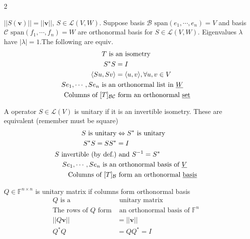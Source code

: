 \documentclass[a4paper,8pt]{extarticle} %
\newcommand{\mybox}[2]{
    \begin{tcolorbox}[colback=lightblue!5!white,colframe=lightblue!75!black,boxsep=1pt,arc=0pt,outer arc=0pt,coltext=black,title={\textcolor{black}{#1}}, before skip=2pt, after skip=2pt]
        #2
    \end{tcolorbox}
}
\begin{document}
\begin{multicols*}{2}
\mybox{Isometry (unitary $\Rightarrow$ isometry)}{
$||S(\mathbf{v})||=||\mathbf{v}||$, $S\in \mathcal{L}(V, W)$. Suppose basis $\mathcal{B}$ $\text{span}(e_1,\cdots, e_n)=V$ and basis $\mathcal{C}$ $\text{span}(f_1,\cdots,f_n)=W$ are orthonormal basis for $S\in \mathcal{L}(V, W)$. Eigenvalues $\lambda$ have $|\lambda|=1. $The following are equiv.
\begin{subequations}
    \begin{align}
        T \text{ is }&\text{an isometry}\\
        S^{*}S&= I\\
        \langle Su, Sv\rangle&=\langle u, v\rangle, \forall u, v\in V\\
        Se_1,\cdots,Se_n \text{ is an} &\text{ orthonormal list in $\underline{W}$}\\
        \text{Columns of }[T]_{\mathcal{BC}} &\text{ form an orthonormal \underline{set}}
    \end{align}
\end{subequations}
}

\mybox{Unitary}{
A operator $S\in \mathcal{L}(V)$ is unitary if it is an invertible isometry. These are equivalent (remember must be square)
\begin{subequations}
    \begin{align}
        S\text{ is unitary} &\Leftrightarrow S^{*} \text{ is unitary}\\
        S^{*}S=SS^{*}&= I\\
        S\text{ invertible (by def.)}& \text{ and $S^{-1}=S^{*}$}\\
        Se_1,\cdots,Se_n \text{ is an}&\text{ orthonormal basis of $\underline{V}$}\\
        \text{Columns of $[T]_{\mathcal{B}}$}&\text{ form an orthonormal \underline{basis}}
    \end{align}
\end{subequations}

$Q\in\mathbb{F}^{n\times n}$ is unitary matrix if columns form orthonormal basis
\begin{subequations}
    \begin{align}
        Q \text{ is a} &\text{ unitary matrix}\\
        \text{The rows of $Q$ form}&\text{ an orthonormal basis of $\mathbb{F}^n$}\\
        ||Q\mathbf{v}||&=||\mathbf{v}||\\
        Q^{*}Q&=QQ^{*}=I
    \end{align}
\end{subequations}
}


\end{multicols*}
\end{document}
